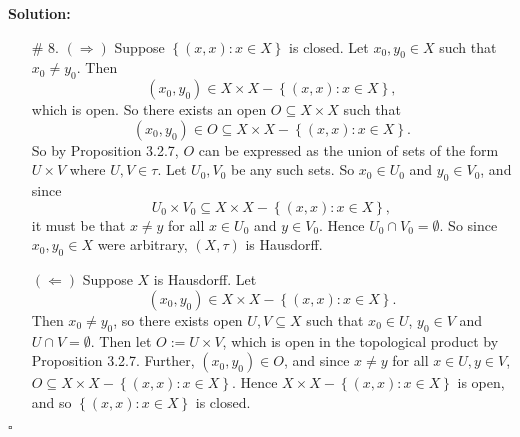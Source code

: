 \documentclass[12pt]{article}
\newcounter{ProofCounter}
\newenvironment{Solution}{\stepcounter{ProofCounter}\textbf{Solution:}}{\hfill$\square$}
\begin{document}
\begin{Solution}
\begin{enumerate}
    \item[\# 8.] $(\Rightarrow)$ Suppose $\left\{ (x,x) : x \in X \right\}$ is closed. Let $x_0, y_0 \in X$ such that $x_0 \neq y_0$.
      Then 
      \[
        (x_0, y_0) \in X \times X - \left\{ (x,x) : x \in X \right\}, 
      \]
      which is open. So there exists an open $O \subseteq X \times X$ such that 
      \[(x_0, y_0) \in O \subseteq X \times X - \left\{ (x,x) : x \in X \right\}.\] So by Proposition 3.2.7, $O$ can be expressed as the union of sets
      of the form $U \times V$ where $U, V \in \tau$. Let $U_0, V_0$ be any such sets. So $x_0 \in U_0$ and $y_0 \in V_0$, and since 
      \[
        U_0 \times V_0 \subseteq X \times X - \left\{ (x,x) : x \in X \right\},
      \]
      it must be that $x \neq y$ for all $x \in U_0$ and $y \in V_0$. Hence $U_0 \cap V_0 = \emptyset$. So since $x_0, y_0 \in X$ were arbitrary, 
      $(X, \tau)$ is Hausdorff.

      $(\Leftarrow)$ Suppose $X$ is Hausdorff. Let
      \[
        (x_0,y_0) \in X\times X - \left\{ (x,x) : x \in X\right\}.
      \]
      Then $x_0 \neq y_0$, so
      there exists open $U, V \subseteq X$ such that $x_0 \in U$, $y_0 \in V$ and $U \cap V = \emptyset$.
      Then let $O := U \times V$, which is open in the topological product by Proposition 3.2.7.
      Further, $(x_0, y_0) \in O$, and since $x \neq y$ for all $x \in U, y \in V$, $O \subseteq X\times X - \left\{ (x,x) : x \in X\right\}$.
      Hence $X\times X - \left\{ (x,x) : x \in X\right\}$ is open, and so $\left\{ (x,x) : x \in X\right\}$ is closed.
  \end{enumerate}
\end{Solution}
\end{document}
